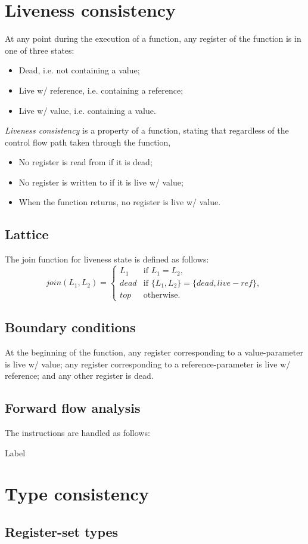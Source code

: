 \documentclass[a4paper]{report}
\begin{document}
\section{Liveness consistency}
At any point during the execution of a function, any register of the
function is in one of three states:
\begin{itemize}
\item Dead, i.e. not containing a value;
\item Live w/ reference, i.e. containing a reference;
\item Live w/ value, i.e. containing a value.
\end{itemize}

\emph{Liveness consistency} is a property of a function, stating that
regardless of the control flow path taken through the function,
\begin{itemize}
\item No register is read from if it is dead;
\item No register is written to if it is live w/ value;
\item When the function returns, no register is live w/ value.
\end{itemize}


\subsection{Lattice}
The join function for liveness state is defined as follows:
\begin{equation*}
join(L_1, L_2) =
\begin{cases}
  L_1 & \text{if } L_1 = L_2,\\
  dead & \text{if } \{L_1,L_2\} = \{dead, live-ref\},\\
  top & \text{otherwise}.
\end{cases}
\end{equation*}

\subsection{Boundary conditions}
At the beginning of the function, any register corresponding to a
value-parameter is live w/ value; any register corresponding to a
reference-parameter is live w/ reference; and any other register is
dead.

\subsection{Forward flow analysis}
The instructions are handled as follows:
\begin{description}
\item[Label] 
\end{description}



\section{Type consistency}

\subsection{Register-set types}
\end{document}
